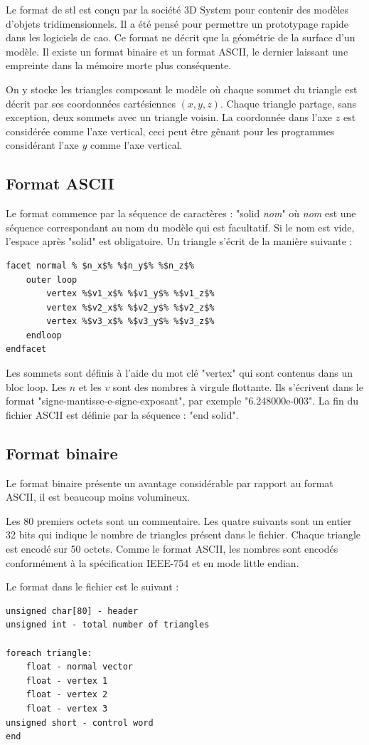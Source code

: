 Le format de \gls{stl} est conçu par la société 3D System pour contenir des modèles d'objets tridimensionnels.
Il a été pensé pour permettre un prototypage rapide dans les logiciels de \gls{cao}. 
Ce format ne décrit que la géométrie de la surface d'un modèle.
Il existe un format binaire et un format ASCII, le dernier laissant une empreinte dans la mémoire morte plus conséquente.

On y stocke les triangles composant le modèle où chaque sommet du triangle est décrit par ses coordonnées cartésiennes $(x,y,z)$. Chaque triangle partage, sans exception, deux sommets avec un triangle voisin.
La coordonnée dans l'axe $z$ est considérée comme l'axe vertical, ceci peut être gênant pour les programmes considérant l'axe $y$ comme l'axe vertical.

\subsection{Format ASCII}

Le format commence par la séquence de caractères : "solid \textit{nom}" où \textit{nom} est une séquence correspondant au nom du modèle qui est facultatif.
Si le nom est vide, l'espace après "solid" est obligatoire.
Un triangle s'écrit de la manière suivante :
\begin{minipage}{\linewidth}
\begin{lstlisting}[frame=single, escapechar=\%]
facet normal % $n_x$% %$n_y$% %$n_z$%
    outer loop
        vertex %$v1_x$% %$v1_y$% %$v1_z$%
        vertex %$v2_x$% %$v2_y$% %$v2_z$%
        vertex %$v3_x$% %$v3_y$% %$v3_z$%
    endloop
endfacet
\end{lstlisting}
\end{minipage}
Les sommets sont définis à l'aide du mot clé "vertex" qui sont contenus dans un bloc loop. Les $n$ et les $v$ sont des nombres à virgule flottante.
Ils s'écrivent dans le format "signe-mantisse-e-signe-exposant", par exemple "6.248000e-003".
La fin du fichier ASCII est définie par la séquence : "end solid".

\subsection{Format binaire}

Le format binaire présente un avantage considérable par rapport au format ASCII, il est beaucoup moins volumineux. 

Les 80 premiers octets sont un commentaire. Les quatre suivants sont un entier 32 bits qui indique le nombre de triangles présent dans le fichier.
Chaque triangle est encodé sur 50 octets. Comme le format ASCII, les nombres sont encodés conformément à la spécification IEEE-754 et en mode little endian.

Le format dans le fichier est le suivant : 

\begin{lstlisting}[frame=single]
unsigned char[80] - header
unsigned int - total number of triangles

foreach triangle:
    float - normal vector
    float - vertex 1
    float - vertex 2
    float - vertex 3
unsigned short - control word
end
\end{lstlisting}
